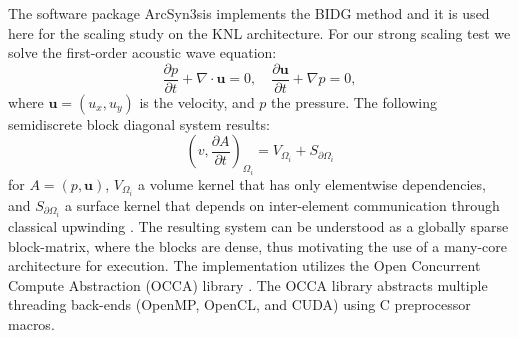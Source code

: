 The software package ArcSyn3sis implements the BIDG method and it is used here
for the scaling study on the KNL architecture. For our strong scaling test we solve the first-order acoustic wave equation:
\begin{equation}
  \label{awe}
  \frac{\partial p}{\partial t} + \nabla\cdot \boldsymbol{u} = 0, \quad
  \frac{\partial\boldsymbol{u}}{\partial t} + \nabla p = 0,
\end{equation}
where $\boldsymbol{u}=(u_x,u_y)$ is the velocity, and $p$ the pressure. The following semidiscrete block diagonal system results:
\[
  \left( v, \frac{ \partial A}{\partial t} \right)_{\Omega_{i}} =
  V_{\Omega_{i}}+S_{\partial\Omega_{i}}
\]
for $A = (p,\boldsymbol{u})$, $V_{\Omega_{i}}$ a volume kernel that has only
elementwise dependencies, and $S_{\partial\Omega_{i}}$ a surface kernel that
depends on inter-element communication through classical upwinding
\cite{Michoski2014898}.  The resulting system can be understood as a globally sparse block-matrix, where the blocks are dense, thus motivating the use of a many-core architecture for execution.  The implementation utilizes the Open Concurrent Compute Abstraction (OCCA) library \cite{MedinaPress}.  The OCCA library abstracts multiple threading back-ends (OpenMP, OpenCL, and CUDA) using C preprocessor macros.



